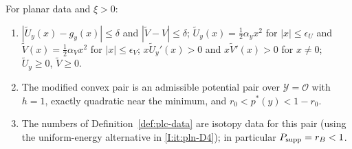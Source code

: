\begin{lemma}\label{lem:plc-data}
For planar data and $\xi>0$:
\begin{enumerate}[label=(\alph*)]
\item $|\widetilde U_y(x)-g_y(x)|\le\delta$ and $|\widetilde V-V|\le\delta$; $\widetilde U_y(x)=\frac12\alpha_yx^2$ for
 $|x|\le\epsilon_U$ and $\widetilde V(x)=\frac12\alpha_Vx^2$ for $|x|\le\epsilon_V$; $x\widetilde U_y'(x)>0$ and
 $x\widetilde V'(x)>0$ for $x\ne0$; $\widetilde U_y\ge0$, $\widetilde V\ge0$.
\item The modified convex pair is an admissible potential pair over $\mathcal Y=\mathcal O$ with $h=1$, exactly
 quadratic near the minimum, and $r_0<p^*(y)<1-r_0$.
\item The numbers of Definition~\ref{def:plc-data} are isotopy data for this pair (using the uniform-energy
 alternative in \ref{I:it:pln-D4}); in particular $P_{\rm supp}=r_B<1$.
\end{enumerate}
\end{lemma}

